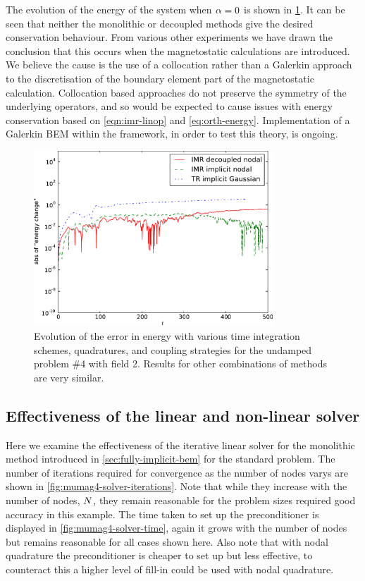 The evolution of the energy of the system when $\alpha = 0$ is shown in \cref{fig:energy-conservation}.
It can be seen that neither the monolithic or decoupled methods give the desired conservation behaviour.
From various other experiments we have drawn the conclusion that this occurs when the magnetostatic calculations are introduced.
We believe the cause is the use of a collocation rather than a Galerkin approach to the discretisation of the boundary element part of the magnetostatic calculation.
Collocation based approaches do not preserve the symmetry of the underlying operators, and so would be expected to cause issues with energy conservation based on \cref{eqn:imr-linop} and \cref{eq:orth-energy}.
Implementation of a Galerkin BEM within the \oomph framework, in order to test this theory, is ongoing.

\begin{figure}
  \centering
  \includegraphics[width=0.8\textwidth]
  {plots/sq_mumag4_energy_conservation/absofenergychangevstimes.pdf}
  \caption{
    Evolution of the error in energy
    with various time integration schemes, quadratures, and coupling strategies
    for the undamped \mumag problem \#4 with field 2.
    Results for other combinations of methods are very similar.
  }
  \label{fig:energy-conservation}
\end{figure}


\subsection{Effectiveness of the linear and non-linear solver}

Here we examine the effectiveness of the iterative linear solver for the monolithic method introduced in \cref{sec:fully-implicit-bem} for the standard problem.
The number of iterations required for convergence as the number of nodes varys are shown in \cref{fig:mumag4-solver-iterations}.
Note that while they increase with the number of nodes, $N$, they remain reasonable for the problem sizes required good accuracy in this example.
The time taken to set up the preconditioner is displayed in \cref{fig:mumag4-solver-time}, again it grows with the number of nodes but remains reasonable for all cases shown here.
Also note that with nodal quadrature the preconditioner is cheaper to set up but less effective, to counteract this a higher level of fill-in could be used with nodal quadrature.

